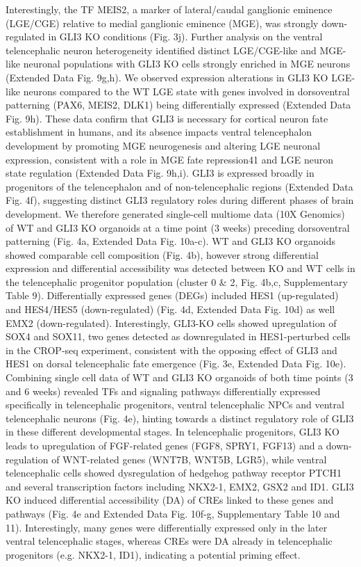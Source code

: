 Interestingly, the TF MEIS2, a marker of lateral/caudal ganglionic eminence (LGE/CGE) relative to medial ganglionic eminence (MGE), was strongly down-regulated in GLI3 KO conditions (Fig. 3j). Further analysis on the ventral telencephalic neuron heterogeneity identified distinct LGE/CGE-like and MGE-like neuronal populations with GLI3 KO cells strongly enriched in MGE neurons (Extended Data Fig. 9g,h). We observed expression alterations in GLI3 KO LGE-like neurons compared to the WT LGE state with genes involved in dorsoventral patterning (PAX6, MEIS2, DLK1) being differentially expressed (Extended Data Fig. 9h). These data confirm that GLI3 is necessary for cortical neuron fate establishment in humans, and its absence impacts ventral telencephalon development by promoting MGE neurogenesis and altering LGE neuronal expression, consistent with a role in MGE fate repression41 and LGE neuron state regulation (Extended Data Fig. 9h,i).
GLI3 is expressed broadly in progenitors of the telencephalon and of non-telencephalic regions (Extended Data Fig. 4f), suggesting distinct GLI3 regulatory roles during different phases of brain development. We therefore generated single-cell multiome data (10X Genomics) of WT and GLI3 KO organoids at a time point (3 weeks) preceding dorsoventral patterning (Fig. 4a, Extended Data Fig. 10a-c). WT and GLI3 KO organoids showed comparable cell composition (Fig. 4b), however strong differential expression and differential accessibility was detected between KO and WT cells in the telencephalic progenitor population (cluster 0 \& 2, Fig. 4b,c, Supplementary Table 9). Differentially expressed genes (DEGs) included HES1 (up-regulated) and HES4/HES5 (down-regulated) (Fig. 4d, Extended Data Fig. 10d) as well EMX2 (down-regulated). Interestingly, GLI3-KO cells showed upregulation of SOX4 and SOX11, two genes detected as downregulated in HES1-perturbed cells in the CROP-seq experiment, consistent with the opposing effect of GLI3 and HES1 on dorsal telencephalic fate emergence (Fig. 3e, Extended Data Fig. 10e).
Combining single cell data of WT and GLI3 KO organoids of both time points (3 and 6 weeks) revealed TFs and signaling pathways differentially expressed specifically in telencephalic progenitors, ventral telencephalic NPCs and ventral telencephalic neurons (Fig. 4e), hinting towards a distinct regulatory role of GLI3 in these different developmental stages. In telencephalic progenitors, GLI3 KO leads to upregulation of FGF-related genes (FGF8, SPRY1, FGF13) and a down-regulation of WNT-related genes (WNT7B, WNT5B, LGR5), while ventral telencephalic cells showed dysregulation of hedgehog pathway receptor PTCH1 and several transcription factors including NKX2-1, EMX2, GSX2 and ID1. GLI3 KO induced differential accessibility (DA) of CREs linked to these genes and pathways (Fig. 4e and Extended Data Fig. 10f-g, Supplementary Table 10 and 11). Interestingly, many genes were differentially expressed only in the later ventral telencephalic stages, whereas CREs were DA already in telencephalic progenitors (e.g. NKX2-1, ID1), indicating a potential priming effect.

